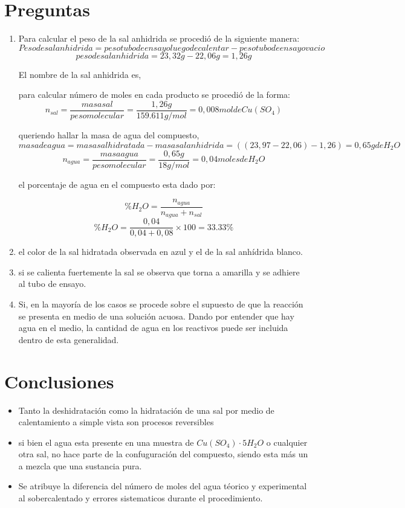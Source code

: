 \documentclass{article}
\begin{document}
\section{Preguntas}

\begin{enumerate}

\item 
Para calcular el peso de la sal anhidrida se procedió de la siguiente manera:
$$Peso de sal anhidrida = peso tubo de ensayo luego de calentar - peso tubo de ensayo vacio $$
$$peso de sal anhidrida= 23,32g -22,06 g = 1,26 g$$

El nombre de la sal anhidrida es, %

para calcular número de moles en cada producto se procedió de la forma:
$$n_{sal}=\frac{masa sal}{peso molecular} =  \frac{1,26 g}{159.611 g/mol}= 0,008 mol de Cu(SO_{4}) $$

queriendo hallar la masa de agua del compuesto,
$$ masa de agua= masa sal hidratada- masa sal anhidrida = ((23,97-22,06)- 1,26) = 0,65 g de H_{2}O$$
$$n_{agua}=\frac{masa agua}{peso molecular} = \frac{0,65 g}{18 g/mol} = 0,04 moles de H_{2}O$$

el porcentaje de agua en el compuesto esta dado por: 

$$ \% H_{2}O = \frac{n_{agua}}{n_{agua}+n_{sal}}$$
$$ \% H_{2}O = \frac{0,04}{0,04+ 0,08} \times 100 = 33.33\% $$


\item el color de la sal hidratada observada en azul y el de la sal anhídrida blanco.

\item si se calienta fuertemente la sal se observa que torna a amarilla y se adhiere al tubo de ensayo.

\item Si, en la mayoría de los casos se procede sobre el supuesto de que la reacción se presenta en medio de una solución acuosa. Dando por entender que hay agua en el medio, la cantidad de agua en los reactivos puede ser incluida dentro de esta generalidad.



\end{enumerate}

\section{Conclusiones}

\begin{itemize}
 \item Tanto la deshidratación como la hidratación de una sal por medio de calentamiento a simple vista son procesos reversibles
 \item si bien el agua esta presente en una muestra de $Cu(SO_{4})\cdot 5H_{2}O$ o cualquier otra sal, no hace parte de la confuguración del compuesto, siendo esta más un a mezcla que una sustancia pura.
 \item Se atribuye la diferencia del número de moles del agua téorico y experimental al sobercalentado y errores sistematicos durante el procedimiento.
\end{itemize}
\end{document}
